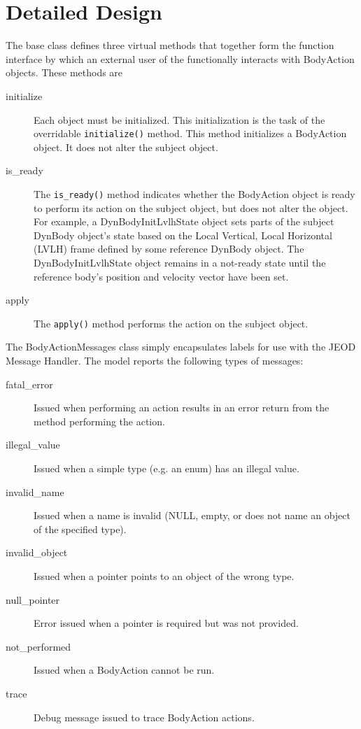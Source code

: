 \section{Detailed Design}
The base class defines three virtual methods that together form the
function interface by which an external user of the \ModelDesc functionally
interacts with BodyAction objects. These methods are
\begin{description}
\item[initialize]
Each \ModelDesc object must be initialized.
This initialization is the task of the overridable {\tt initialize()}
method. This method initializes a BodyAction object.
It does not alter the subject object.
\item[is\_ready]
The {\tt is\_ready()} method indicates whether the BodyAction object is
ready to perform its action on the subject object, but does not alter the object.
For example, a DynBodyInitLvlhState object sets parts of the subject
DynBody object's state based on the Local Vertical, Local Horizontal (LVLH)
frame defined by some reference DynBody object.
The DynBodyInitLvlhState object remains in a not-ready state
until the reference body's position and velocity vector have been set.
\item[apply]
The {\tt apply()} method performs the action on the subject object.
\end{description}

The BodyActionMessages class simply encapsulates labels for use with the
JEOD Message Handler. The model reports the following types of messages:
\begin{description}
\item[fatal\_error]
      Issued when performing an action results in an error return from the
      method performing the action.
\item[illegal\_value]
      Issued when a simple type (e.g. an enum) has an illegal value.
\item[invalid\_name]
      Issued when a name is invalid (NULL, empty, or does not name an object
      of the specified type).
\item[invalid\_object]
      Issued when a pointer points to an object of the wrong type.
\item[null\_pointer]
      Error issued when a pointer is required but was not provided.
\item[not\_performed]
      Issued when a BodyAction cannot be run.
\item[trace]
      Debug message issued to trace BodyAction actions.
\end{description}
